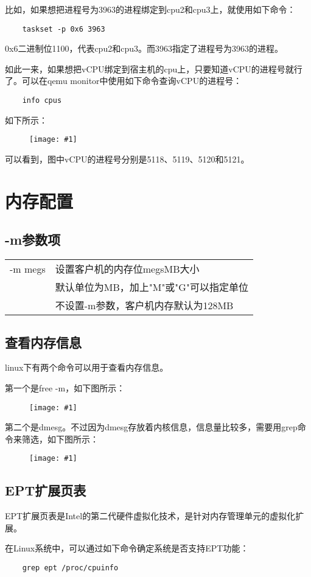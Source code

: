 \documentclass[a4paper,left=2.5cm,right=2.5cm,11pt]{article}
\newcommand{\fic}[1]{\begin{figure}[H]
		\center
		\texttt{[image: \#1]}
	\end{figure}}
\begin{document}
	比如，如果想把进程号为3963的进程绑定到cpu2和cpu3上，就使用如下命令：
	\begin{lstlisting}
	taskset -p 0x6 3963
	\end{lstlisting}

	0x6二进制位1100，代表cpu2和cpu3。而3963指定了进程号为3963的进程。\par
	如此一来，如果想把vCPU绑定到宿主机的cpu上，只要知道vCPU的进程号就行了。可以在qemu monitor中使用如下命令查询vCPU的进程号：
	\begin{lstlisting}
	info cpus
	\end{lstlisting}

	如下所示：
	\fic{3.png}

	可以看到，图中vCPU的进程号分别是5118、5119、5120和5121。

\clearpage

\section{内存配置}
\subsection{-m参数项}
\begin{longtable}{p{2cm}p{8cm}}
\hline
-m megs & 设置客户机的内存位megsMB大小 \\
	    & 默认单位为MB，加上"M"或"G"可以指定单位 \\
		& 不设置-m参数，客户机内存默认为128MB \\
\hline
\end{longtable}
\subsection{查看内存信息}
	linux下有两个命令可以用于查看内存信息。\par
	第一个是free -m，如下图所示：
	\fic{5.png}

	第二个是dmesg。不过因为dmesg存放着内核信息，信息量比较多，需要用grep命令来筛选，如下图所示：
	\fic{4.png}

\subsection{EPT扩展页表}
	EPT扩展页表是Intel的第二代硬件虚拟化技术，是针对内存管理单元的虚拟化扩展。\par
	在Linux系统中，可以通过如下命令确定系统是否支持EPT功能：
	\begin{lstlisting}
	grep ept /proc/cpuinfo
	\end{lstlisting}
\end{document}
